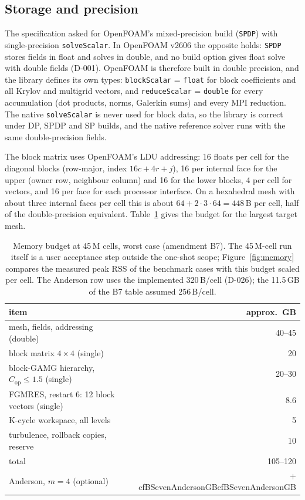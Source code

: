 \documentclass[11pt,a4paper]{article}
\newcommand{\cfpendingmark}{\fbox{\scriptsize pending}}
\newcommand{\cfnum}[1]{%
  \ifcsname cf#1\endcsname\csname cf#1\endcsname\else\cfpendingmark\fi}
\newcommand{\code}[1]{\texttt{#1}}
\begin{document}
\subsection{Storage and precision}\label{sec:storage}

The specification asked for OpenFOAM's mixed-precision build (\code{SPDP})
with single-precision \code{solveScalar}. In OpenFOAM v2606 the opposite
holds: \code{SPDP} stores fields in float and solves in double, and no build
option gives float solve with double fields (D-001). OpenFOAM is therefore
built in double precision, and the library defines its own types:
\code{blockScalar} = \code{float} for block coefficients and all Krylov and
multigrid vectors, and \code{reduceScalar} = \code{double} for every
accumulation (dot products, norms, Galerkin sums) and every MPI reduction.
The native \code{solveScalar} is never used for block data, so the library is
correct under DP, SPDP and SP builds, and the native reference solver runs
with the same double-precision fields.

The block matrix uses OpenFOAM's LDU addressing: 16 floats per cell for the
diagonal blocks (row-major, index $16c+4r+j$), 16 per internal face for the
upper (owner row, neighbour column) and 16 for the lower blocks, 4 per cell
for vectors, and 16 per face for each processor interface. On a hexahedral
mesh with about three internal faces per cell this is about
$64+2\cdot3\cdot64=448$\,B per cell, half of the double-precision
equivalent. Table~\ref{tab:memory} gives the budget for the largest target
mesh.

\begin{table}[tbp]
\centering\small
\caption{Memory budget at 45\,M cells, worst case (amendment B7). The
45\,M-cell run itself is a user acceptance step outside the one-shot scope;
Figure~\ref{fig:memory} compares the measured peak RSS of the benchmark
cases with this budget scaled per cell. The Anderson row uses the
implemented 320\,B/cell (D-026); the 11.5\,GB of the B7 table assumed
256\,B/cell.}
\label{tab:memory}
\begin{tabular}{lr}
\toprule
item & approx.\ GB\\
\midrule
mesh, fields, addressing (double) & 40--45\\
block matrix $4\times4$ (single) & 20\\
block-GAMG hierarchy, $C_{\mathrm{op}}\le1.5$ (single) & 20--30\\
FGMRES, restart 6: 12 block vectors (single) & 8.6\\
K-cycle workspace, all levels & 5\\
turbulence, rollback copies, reserve & 10\\
\midrule
total & 105--120\\
Anderson, $m=4$ (optional) & $+$\cfnum{BSevenAndersonGB}\\
\bottomrule
\end{tabular}
\end{table}
\end{document}
